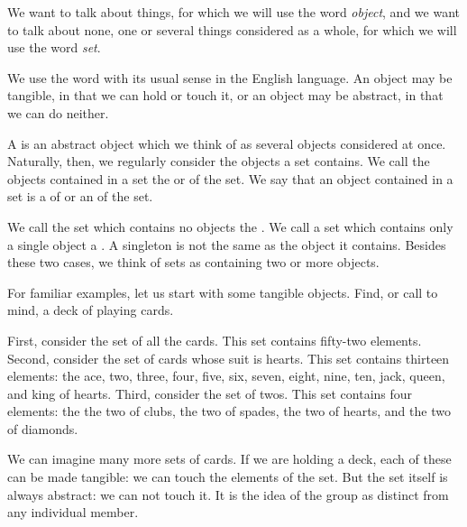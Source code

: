 
\sbasic



\sstart



We want to talk about things,
for which we will use the word
\textit{object},
and we want to talk
about none, one or
several things considered
as a whole,
for which we will use
the word \textit{set}.


We use the word 
with its usual sense in the English
language.
An object may be tangible, in that
we can hold or touch it,
or an object may be abstract,
in that we can do neither.

A  is an abstract
object which we think of as
several objects considered
at once.
Naturally, then,
we regularly consider the
objects a set contains.
We call the objects contained
in a set the
 or
 of the set.
We say that an object
contained in a set is a
 of or an
 of the set.

We call the set which contains
no objects the
.
We call
a set which contains
only a single object a
.
A singleton is not the
same as the object
it contains.
Besides these two cases,
we think of sets
as containing
two or more objects.




For familiar examples,
let us start
with some tangible
objects.
Find, or call to
mind,
a deck
of playing cards.

First, consider
the set of all
the cards.
This set contains
fifty-two elements.
Second, consider
the set of cards
whose suit is hearts.
This set contains
thirteen elements:
the ace, two, three, four, five,
six, seven, eight, nine, ten,
jack, queen, and
king of hearts.
Third, consider
the set of twos.
This set contains
four elements: the
the two of clubs,
the two of spades,
the two of hearts,
and the two of diamonds.

We can imagine many
more sets of cards.
If we are holding a deck,
each of these can be
made tangible: we can
touch the elements of
the set.
But the set itself
is always abstract:
we can not touch it.
It is the idea of the
group as distinct from
any individual member.

